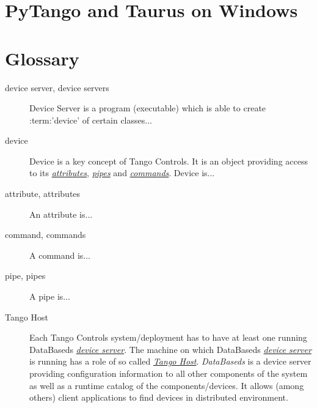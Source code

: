 \documentclass[letterpaper,10pt,english]{sphinxmanual}
\begin{document}
\chapter{PyTango and Taurus on Windows}
\label{pytango-and-taurus-on-windows:pytango-and-taurus-on-windows}\label{pytango-and-taurus-on-windows::doc}

\chapter{Glossary}
\label{glossary:glossary}\label{glossary::doc}\label{glossary:index-0}\begin{description}
\item[{device server, device servers}] \leavevmode{}\label{glossary:term-device-server}
Device Server is a program (executable) which is able to create :term:'device' of certain classes...

\item[{device}] \leavevmode{}\label{glossary:term-device}
Device is a key concept of Tango Controls. It is an object providing access to its {\hyperref[glossary:term-attributes]{\emph{attributes}}},
{\hyperref[glossary:term-pipes]{\emph{pipes}}} and {\hyperref[glossary:term-commands]{\emph{commands}}}. Device is...

\item[{attribute, attributes}] \leavevmode{}\label{glossary:term-attribute}
An attribute is...

\item[{command, commands}] \leavevmode{}\label{glossary:term-command}
A command is...

\item[{pipe, pipes}] \leavevmode{}\label{glossary:term-pipe}
A pipe is...

\item[{Tango Host}] \leavevmode{}\label{glossary:term-tango-host}
Each Tango Controls system/deployment has to have at least one running DataBaseds {\hyperref[glossary:term-device-server]{\emph{device server}}}.
The machine on which DataBaseds {\hyperref[glossary:term-device-server]{\emph{device server}}} is running has a role of so called {\hyperref[glossary:term-tango-host]{\emph{Tango Host}}}.
\emph{DataBaseds} is a device server providing configuration information to all other components of the system as
well as a runtime catalog of the components/devices. It allows (among others) client applications to find
devices in distributed environment.

\end{description}
\end{document}
